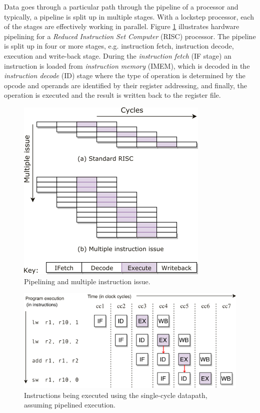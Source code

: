 Data goes through a particular path through the pipeline of a processor and typically, a pipeline is split up in multiple stages. With a lockstep processor, each of the stages are effectively working in parallel. Figure \ref{fig:pipelining} illustrates hardware pipelining for a \emph{Reduced Instruction Set Computer} (RISC) processor. The pipeline is split up in four or more stages, e.g. instruction fetch, instruction decode, execution and write-back stage. During the \emph{instruction fetch} (IF stage) an instruction is loaded from \emph{instruction memory} (IMEM), which is decoded in the \emph{instruction decode} (ID) stage where the type of operation is determined by the opcode and operands are identified by their register addressing, and finally, the operation is executed and the result is written back to the register file.

\begin{figure}[H]
\centering
\includegraphics[width=.5\textwidth]{figures/pipelining}
\caption{Pipelining and multiple instruction issue\cite{tta_codegen}.}
\label{fig:pipelining}
\end{figure}

\begin{figure}[b]
\centering
\includegraphics[width=.8\textwidth]{figures/bypassing_example}
\caption{Instructions being executed using the single-cycle datapath, assuming pipelined execution.}
\label{fig:bypass_problem}
\end{figure}

